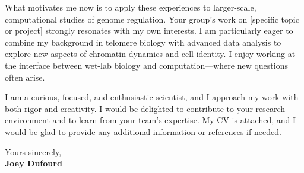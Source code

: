 \documentclass[11pt,a4paper]{article}
\begin{document}
What motivates me now is to apply these experiences to larger-scale, computational studies of genome regulation. Your group’s work on [specific topic or project] strongly resonates with my own interests. I am particularly eager to combine my background in telomere biology with advanced data analysis to explore new aspects of chromatin dynamics and cell identity. I enjoy working at the interface between wet-lab biology and computation—where new questions often arise.

I am a curious, focused, and enthusiastic scientist, and I approach my work with both rigor and creativity. I would be delighted to contribute to your research environment and to learn from your team’s expertise. My CV is attached, and I would be glad to provide any additional information or references if needed.

\vspace{0.4cm}
\noindent
Yours sincerely,\\[0.5cm]
\textbf{Joey Dufourd}
\end{document}
